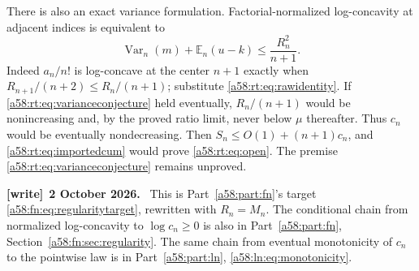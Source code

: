 \documentclass[11pt,letterpaper]{article}
\theoremstyle{remark}
\newcommand{\E}{\mathbb E}
\newcommand{\Var}{\operatorname{Var}}
\newenvironment{writenote}[1][]{\par\smallskip\begingroup\small
 \noindent\textbf{[write]}\if\relax\detokenize{#1}\relax\else~\textbf{#1.}\fi\ }%
 {\par\endgroup\smallskip}
\begin{document}
There is also an exact variance formulation. Factorial-normalized
log-concavity at adjacent indices is equivalent to
\begin{equation}\label{a58:rt:eq:varianceconjecture}
 \Var_n(m)+\E_n(u-k)\le\frac{R_n^2}{n+1}.
\end{equation}
Indeed $a_n/n!$ is log-concave at the center $n+1$ exactly when
$R_{n+1}/(n+2)\le R_n/(n+1)$; substitute
\eqref{a58:rt:eq:rawidentity}. If \eqref{a58:rt:eq:varianceconjecture} held eventually,
$R_n/(n+1)$ would be nonincreasing and, by the proved ratio limit,
never below $\mu$ thereafter. Thus $c_n$ would be eventually
nondecreasing. Then $S_n\le O(1)+(n+1)c_n$, and
\eqref{a58:rt:eq:importedcum} would prove \eqref{a58:rt:eq:open}.
The premise \eqref{a58:rt:eq:varianceconjecture} remains unproved.
\begin{writenote}[2 October 2026]
This is Part~\ref{a58:part:fn}'s target \eqref{a58:fn:eq:regularitytarget}, rewritten with $R_n=M_n$. The conditional chain from normalized log-concavity to $\log c_n\ge0$ is also in Part~\ref{a58:part:fn}, Section~\ref{a58:fn:sec:regularity}. The same chain from eventual monotonicity of $c_n$ to the pointwise law is in Part~\ref{a58:part:ln}, \eqref{a58:ln:eq:monotonicity}.
\end{writenote}
\end{document}
